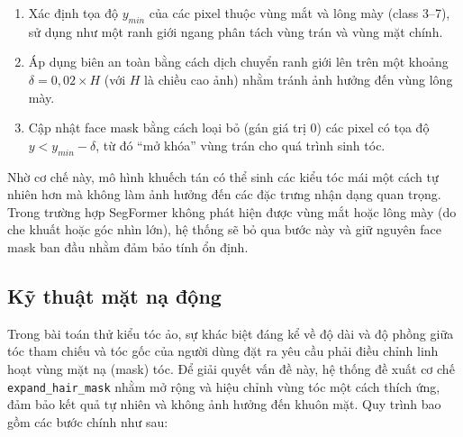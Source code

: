 \documentclass[../main.tex]{subfiles}
\begin{document}
\begin{enumerate}
    \item Xác định tọa độ $y_{min}$ của các pixel thuộc vùng mắt và lông mày (class 3--7), sử dụng như một ranh giới ngang phân tách vùng trán và vùng mặt chính.

    \item Áp dụng biên an toàn bằng cách dịch chuyển ranh giới lên trên một khoảng $\delta = 0{,}02 \times H$ (với $H$ là chiều cao ảnh) nhằm tránh ảnh hưởng đến vùng lông mày.

    \item Cập nhật face mask bằng cách loại bỏ (gán giá trị 0) các pixel có tọa độ $y < y_{min} - \delta$, từ đó “mở khóa” vùng trán cho quá trình sinh tóc.
\end{enumerate}

Nhờ cơ chế này, mô hình khuếch tán có thể sinh các kiểu tóc mái một cách tự nhiên hơn mà không làm ảnh hưởng đến các đặc trưng nhận dạng quan trọng. Trong trường hợp SegFormer không phát hiện được vùng mắt hoặc lông mày (do che khuất hoặc góc nhìn lớn), hệ thống sẽ bỏ qua bước này và giữ nguyên face mask ban đầu nhằm đảm bảo tính ổn định.
\subsection{Kỹ thuật mặt nạ động}

Trong bài toán thử kiểu tóc ảo, sự khác biệt đáng kể về độ dài và độ phồng giữa tóc tham chiếu và tóc gốc của người dùng đặt ra yêu cầu phải điều chỉnh linh hoạt vùng mặt nạ (mask) tóc. Để giải quyết vấn đề này, hệ thống đề xuất cơ chế \texttt{expand\_hair\_mask} nhằm mở rộng và hiệu chỉnh vùng tóc một cách thích ứng, đảm bảo kết quả tự nhiên và không ảnh hưởng đến khuôn mặt. Quy trình bao gồm các bước chính như sau:
\end{document}
